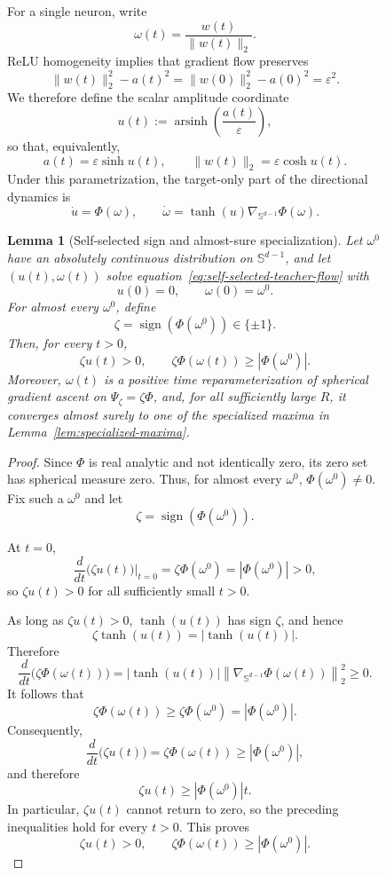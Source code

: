 \documentclass{article}
\def\eqref#1{equation~\ref{#1}}
\newtheorem{lemma}[lemma]{Lemma}
\begin{document}
\begin{figure}
For a single neuron, write
\[
    \omega(t)=\frac{w(t)}{\|w(t)\|_2}.
\]
ReLU homogeneity implies that gradient flow preserves
\[
    \|w(t)\|_2^2-a(t)^2
    =
    \|w(0)\|_2^2-a(0)^2
    =
    \varepsilon^2.
\]
We therefore define the scalar amplitude coordinate
\[
    u(t)
    :=
    \operatorname{arsinh}\!\left(\frac{a(t)}{\varepsilon}\right),
\]
so that, equivalently,
\[
    a(t)=\varepsilon\sinh u(t),
    \qquad
    \|w(t)\|_2=\varepsilon\cosh u(t).
\]
Under this parametrization, the target-only part of the directional dynamics
is
\begin{equation}
\label{eq:self-selected-teacher-flow}
    \dot u=\Phi(\omega),
    \qquad
    \dot\omega
    =
    \tanh(u)\nabla_{\mathbb S^{d-1}}\Phi(\omega).
\end{equation}

\begin{lemma}[Self-selected sign and almost-sure specialization]
\label{lem:self-selected-specialization}
Let $\omega^0$ have an absolutely continuous distribution on
$\mathbb S^{d-1}$, and let $(u(t),\omega(t))$ solve
\eqref{eq:self-selected-teacher-flow} with
\[
    u(0)=0,
    \qquad
    \omega(0)=\omega^0.
\]
For almost every $\omega^0$, define
\[
    \zeta
    =
    \operatorname{sign}(\Phi(\omega^0))
    \in\{\pm1\}.
\]
Then, for every $t>0$,
\[
    \zeta u(t)>0,
    \qquad
    \zeta\Phi(\omega(t))
    \geq
    |\Phi(\omega^0)|.
\]
Moreover, $\omega(t)$ is a positive time reparameterization of spherical
gradient ascent on $\Psi_\zeta=\zeta\Phi$, and, for all sufficiently large
$R$, it converges almost surely to one of the specialized maxima in
Lemma~\ref{lem:specialized-maxima}.
\end{lemma}


\begin{proof}
Since $\Phi$ is real analytic and not identically zero, its zero set has
spherical measure zero. Thus, for almost every ${\omega^0}$, $\Phi({\omega^0})\neq0$.
Fix such a ${\omega^0}$ and let
\[
    \zeta=\operatorname{sign}(\Phi({\omega^0})).
\]

At $t=0$,
\[
    \frac{d}{dt}\bigl(\zeta u(t)\bigr)\bigg|_{t=0}
    =
    \zeta\Phi({\omega^0})
    =
    |\Phi({\omega^0})|
    >0,
\]
so $\zeta u(t)>0$ for all sufficiently small $t>0$.

As long as $\zeta u(t)>0$, $\tanh(u(t))$ has sign $\zeta$, and hence
\[
    \zeta\tanh(u(t))=|\tanh(u(t))|.
\]
Therefore
\[
    \frac{d}{dt}\bigl(\zeta\Phi({\omega(t)})\bigr)
    =
    |\tanh(u(t))|
    \left\|
        \nabla_{\mathbb S^{d-1}}\Phi({\omega(t)})
    \right\|_2^2
    \geq0.
\]
It follows that
\[
    \zeta\Phi({\omega(t)})
    \geq
    \zeta\Phi({\omega^0})
    =
    |\Phi({\omega^0})|.
\]
Consequently,
\[
    \frac{d}{dt}\bigl(\zeta u(t)\bigr)
    =
    \zeta\Phi({\omega(t)})
    \geq
    |\Phi({\omega^0})|,
\]
and therefore
\[
    \zeta u(t)\geq |\Phi({\omega^0})|t.
\]
In particular, $\zeta u(t)$ cannot return to zero, so the preceding
inequalities hold for every $t>0$. This proves
\[
    \zeta u(t)>0,
    \qquad
    \zeta\Phi({\omega(t)})
    \geq
    |\Phi({\omega^0})|.
\]


\end{proof}
\end{figure}
\end{document}
